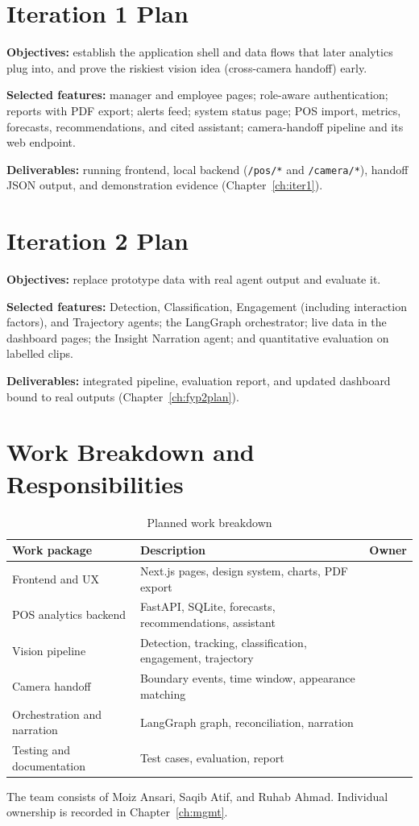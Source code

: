 \section{Iteration 1 Plan}
\textbf{Objectives:} establish the application shell and data flows that later analytics plug into, and prove the riskiest vision idea (cross-camera handoff) early.

\textbf{Selected features:} manager and employee pages; role-aware authentication; reports with PDF export; alerts feed; system status page; POS import, metrics, forecasts, recommendations, and cited assistant; camera-handoff pipeline and its web endpoint.

\textbf{Deliverables:} running frontend, local backend (\texttt{/pos/*} and \texttt{/camera/*}), handoff JSON output, and demonstration evidence (Chapter~\ref{ch:iter1}).

\section{Iteration 2 Plan}
\textbf{Objectives:} replace prototype data with real agent output and evaluate it.

\textbf{Selected features:} Detection, Classification, Engagement (including interaction factors), and Trajectory agents; the LangGraph orchestrator; live data in the dashboard pages; the Insight Narration agent; and quantitative evaluation on labelled clips.

\textbf{Deliverables:} integrated pipeline, evaluation report, and updated dashboard bound to real outputs (Chapter~\ref{ch:fyp2plan}).

\section{Work Breakdown and Responsibilities}
\begin{table}[H]
\centering
\caption{Planned work breakdown}
\begin{tabular}{P{0.3\textwidth}P{0.45\textwidth}P{0.15\textwidth}}
\toprule
Work package & Description & Owner\\
\midrule
Frontend and UX & Next.js pages, design system, charts, PDF export & \\
POS analytics backend & FastAPI, SQLite, forecasts, recommendations, assistant & \\
Vision pipeline & Detection, tracking, classification, engagement, trajectory & \\
Camera handoff & Boundary events, time window, appearance matching & \\
Orchestration and narration & LangGraph graph, reconciliation, narration & \\
Testing and documentation & Test cases, evaluation, report & \\
\bottomrule
\end{tabular}
\end{table}
The team consists of Moiz Ansari, Saqib Atif, and Ruhab Ahmad. Individual ownership is recorded in Chapter~\ref{ch:mgmt}.

